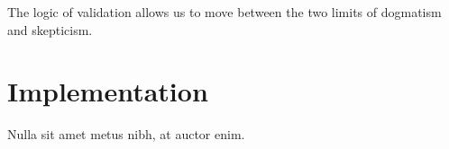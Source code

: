 

\begin{savequote}[50mm]
The logic of validation allows us to move between the two limits of dogmatism and skepticism. 
\end{savequote}


\chapter{Implementation}
\label{cha:implementation}

\ifpdf
    \graphicspath{{4_experiments_and_results/figures/PNG/}{4_experiments_and_results/figures/PDF/}{4_experiments_and_results/figures/}}
\else
    \graphicspath{{4_experiments_and_results/figures/EPS/}{4_experiments_and_results/figures/}}
\fi



Nulla sit amet metus nibh, at auctor enim.







